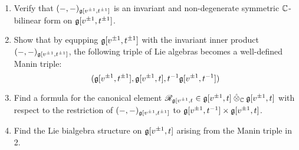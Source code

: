             \begin{question} 
                \begin{enumerate}
                    \item Verify that $(-, -)_{\mathfrak{g}[v^{\pm 1}, t^{\pm 1}]}$ is an invariant and non-degenerate symmetric $\mathbb{C}$-bilinear form on $\mathfrak{g}[v^{\pm 1}, t^{\pm 1}]$.
                    \item Show that by equpping $\mathfrak{g}[v^{\pm 1}, t^{\pm 1}]$ with the invariant inner product $(-, -)_{\mathfrak{g}[v^{\pm 1}, t^{\pm 1}]}$, the following triple of Lie algebras becomes a well-defined Manin triple:
                        $$(\mathfrak{g}[v^{\pm 1}, t^{\pm 1}], \mathfrak{g}[v^{\pm 1}, t], t^{-1}\mathfrak{g}[v^{\pm 1}, t^{-1}])$$
                    \item Find a formula for the canonical element $\scrR_{\g[v^{\pm 1}, t} \in \g[v^{\pm 1}, t] \hattensor_{\bbC} \g[v^{\pm 1}, t]$ with respect to the restriction of $(-, -)_{\mathfrak{g}[v^{\pm 1}, t^{\pm 1}]}$ to $\g[v^{\pm 1}, t^{-1}] \x \g[v^{\pm 1}, t]$.
                    \item Find the Lie bialgebra structure on $\mathfrak{g}[v^{\pm 1}, t]$ arising from the Manin triple in 2.
                \end{enumerate}
            \end{question}
